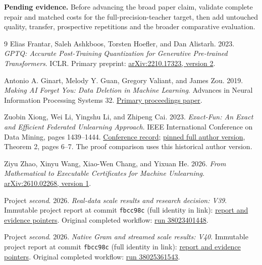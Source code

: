 \documentclass[10pt,twocolumn,letterpaper]{article}
\newcommand{\pending}[1]{\par\noindent\textbf{Pending evidence.} #1\par}
\begin{document}
\pending{Before advancing the broad paper claim, validate complete repair and matched
costs for the full-precision-teacher target, then add untouched quality, transfer,
prospective repetitions and the broader comparative evaluation.}

\begin{thebibliography}{9}
Elias Frantar, Saleh Ashkboos, Torsten Hoefler, and Dan Alistarh.
2023. \emph{GPTQ: Accurate Post-Training Quantization for Generative Pre-trained
Transformers}. ICLR. Primary preprint:
\href{https://arxiv.org/abs/2210.17323v2}{arXiv:2210.17323, version 2}.

Antonio A. Ginart, Melody Y. Guan, Gregory Valiant, and James Zou.
2019. \emph{Making AI Forget You: Data Deletion in Machine Learning}.
Advances in Neural Information Processing Systems 32.
\href{https://papers.nips.cc/paper_files/paper/2019/file/cb79f8fa58b91d3af6c9c991f63962d3-Paper.pdf}{Primary proceedings paper}.

Zuobin Xiong, Wei Li, Yingshu Li, and Zhipeng Cai.
2023. \emph{Exact-Fun: An Exact and Efficient Federated Unlearning Approach}.
IEEE International Conference on Data Mining, pages 1439--1444.
\href{https://doi.org/10.1109/ICDM58522.2023.00188}{Conference record};
\href{https://github.com/zuobinxiong/zuobinxiong.github.io/blob/300a0672be8d265ddebf20d6e69f790456a1bd81/assets/pdf/ExactFedUnlearning.pdf}{pinned full author version},
Theorem 2, pages 6--7. The proof comparison uses this historical author version.

Ziyu Zhao, Xinyu Wang, Xiao-Wen Chang, and Yixuan He.
2026. \emph{From Mathematical to Executable Certificates for Machine Unlearning}.
\href{https://arxiv.org/html/2610.02268v1}{arXiv:2610.02268, version 1}.

Project \emph{second}. 2026. \emph{Real-data scale results and research decision:
V39}. Immutable project report at commit
\texttt{fbcc98c} (full identity in link):
\href{https://github.com/priyankjairaj100/second/blob/fbcc98c6559de4b88ffc9c8b960cf680d89e29d3/docs/SCALE_RESULTS_V39.md}{report and evidence pointers}.
Original completed workflow:
\href{https://github.com/priyankjairaj100/second/actions/runs/38023401448}{run 38023401448}.

Project \emph{second}. 2026. \emph{Native Gram and streamed scale results: V40}.
Immutable project report at commit
\texttt{fbcc98c} (full identity in link):
\href{https://github.com/priyankjairaj100/second/blob/fbcc98c6559de4b88ffc9c8b960cf680d89e29d3/docs/NATIVE_SCALE_RESULTS_V40.md}{report and evidence pointers}.
Original completed workflow:
\href{https://github.com/priyankjairaj100/second/actions/runs/38025361543}{run 38025361543}.


\end{thebibliography}
\end{document}
